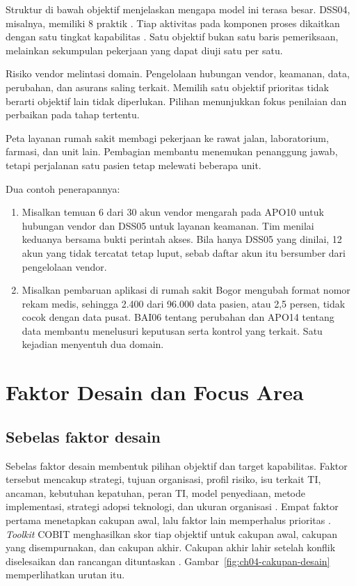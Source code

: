 Struktur di bawah objektif menjelaskan mengapa model ini terasa besar. DSS04, misalnya, memiliki 8 praktik
\cite{c04-sistematis}. Tiap aktivitas pada komponen proses dikaitkan dengan satu tingkat kapabilitas
\cite{c04-baru}. Satu objektif bukan satu baris pemeriksaan, melainkan sekumpulan pekerjaan yang dapat
diuji satu per satu.

Risiko vendor melintasi domain. Pengelolaan hubungan vendor, keamanan, data, perubahan, dan asurans saling
terkait. Memilih satu objektif prioritas tidak berarti objektif lain tidak diperlukan. Pilihan menunjukkan
fokus penilaian dan perbaikan pada tahap tertentu.

Peta layanan rumah sakit membagi pekerjaan ke rawat jalan, laboratorium, farmasi, dan unit lain. Pembagian
membantu menemukan penanggung jawab, tetapi perjalanan satu pasien tetap melewati beberapa unit.

Dua contoh penerapannya:
\begin{enumerate}
  \item Misalkan temuan 6 dari 30 akun vendor mengarah pada APO10 untuk hubungan vendor dan DSS05 untuk
  layanan keamanan. Tim menilai keduanya bersama bukti perintah akses. Bila hanya DSS05 yang dinilai,
  12 akun yang tidak tercatat tetap luput, sebab daftar akun itu bersumber dari pengelolaan vendor.
  \item Misalkan pembaruan aplikasi di rumah sakit Bogor mengubah format nomor rekam medis, sehingga
  2.400 dari 96.000 data pasien, atau 2,5 persen, tidak cocok dengan data pusat. BAI06 tentang perubahan
  dan APO14 tentang data membantu menelusuri keputusan serta kontrol yang terkait. Satu kejadian
  menyentuh dua domain.
\end{enumerate}

\section{Faktor Desain dan Focus Area}

\subsection*{Sebelas faktor desain}

Sebelas faktor desain membentuk pilihan objektif dan target kapabilitas. Faktor tersebut mencakup
strategi, tujuan organisasi, profil risiko, isu terkait TI, ancaman, kebutuhan kepatuhan, peran TI, model
penyediaan, metode implementasi, strategi adopsi teknologi, dan ukuran organisasi
\cite{cobit2019-design,c04-perbandingan,c04-operasional}. Empat faktor pertama menetapkan cakupan awal, lalu
faktor lain memperhalus prioritas \cite{c04-kapabilitas,c04-perbandingan}. \textit{Toolkit} COBIT
menghasilkan skor tiap objektif untuk cakupan awal, cakupan yang disempurnakan, dan cakupan akhir. Cakupan
akhir lahir setelah konflik diselesaikan dan rancangan dituntaskan \cite{c04-perbandingan}.
Gambar~\ref{fig:ch04-cakupan-desain} memperlihatkan urutan itu.

